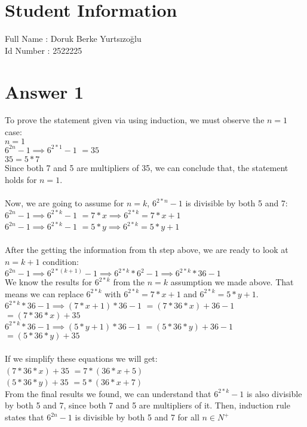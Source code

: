 \documentclass[12pt]{article}
\begin{document}
\section*{Student Information }
Full Name : Doruk Berke Yurtsızoğlu \\
Id Number : 2522225 \\

\section*{Answer 1}
To prove the statement given via using induction, we must observe the $n = 1$ case: \\
$n = 1$\\
$6^{2n} - 1$$\implies$$6^{2*1} - 1$ $ = 35$\\
$35 = 5*7$\\
Since both 7 and 5 are multipliers of 35, we can conclude that, the statement holds for $n = 1$.\\
\\
Now, we are going to assume for $n = k$, $6^{2*n} - 1$ is divisible by both 5 and 7:\\
$6^{2n} - 1$$\implies$$6^{2*k} - 1$ $ = 7*x$$\implies$$6^{2*k} = 7*x+1$\\
$6^{2n} - 1$$\implies$$6^{2*k} - 1$ $ = 5*y$$\implies$$6^{2*k} = 5*y+1$\\
\\
After the getting the information from th step above, we are ready to look at $n = k+1$ condition:\\
$6^{2n} - 1$$\implies$$6^{2*(k+1)} - 1$$\implies$$6^{2*k}*6^{2}-1$$\implies$$6^{2*k}*36-1$\\
We know the results for $6^{2*k}$ from the $n = k$ assumption we made above. That means we can replace $6^{2*k}$ with $6^{2*k} = 7*x+1$ and $6^{2*k} = 5*y+1$.\\
$6^{2*k}*36-1$$\implies$$(7*x+1) * 36 - 1$ $= (7*36*x) + 36 - 1$$= (7*36*x) + 35$\\
$6^{2*k}*36-1$$\implies$$(5*y+1) * 36 - 1$ $= (5*36*y) + 36 - 1$$= (5*36*y) + 35$\\
\\
If we simplify these equations we will get:\\
$(7*36*x) + 35$ $= 7*(36*x+5)$\\
$(5*36*y) + 35$ $= 5*(36*x+7)$\\
From the final results we found, we can understand that $6^{2*k} - 1$ is also divisible by both 5 and 7, since both 7 and 5 are multipliers of it. Then, induction rule states that $6^{2n} - 1$ is divisible by both 5 and 7  for all $n \in N^{+}$\\
\end{document}
